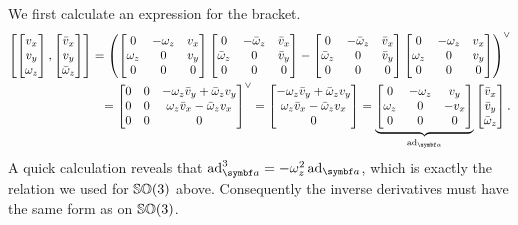 We first calculate an expression for the bracket.
\begin{equation}
  \begin{aligned}
    \left[ \begin{bmatrix} v_x \\ v_y \\ \omega_z \end{bmatrix}, \begin{bmatrix} \bar v_x \\ v_y \\ \bar \omega_z \end{bmatrix} \right] = \left( \begin{bmatrix}
      0 & -\omega_z & v_x \\ \omega_z & 0 & v_y \\ 0 & 0 & 0
    \end{bmatrix}\begin{bmatrix}
      0 & -\bar\omega_z & \bar v_x \\ \bar\omega_z & 0 & \bar v_y \\ 0 & 0 & 0
    \end{bmatrix} - \begin{bmatrix}
      0 & -\bar\omega_z & \bar v_x \\ \bar\omega_z & 0 & \bar v_y \\ 0 & 0 & 0
    \end{bmatrix}\begin{bmatrix}
      0 & -\omega_z & v_x \\ \omega_z & 0 & v_y \\ 0 & 0 & 0
    \end{bmatrix} \right)^{\vee} \\
    = \begin{bmatrix} 0 & 0 & -\omega_z \bar v_y + \bar \omega_z v_y \\
                0 & 0 & \omega_z \bar v_x - \bar \omega_z v_x  \\
                0 & 0 & 0
    \end{bmatrix}^\vee
    = \begin{bmatrix}  -\omega_z \bar v_y + \bar \omega_z v_y \\ \omega_z \bar v_x - \bar \omega_z v_x \\ 0 \end{bmatrix} = \underbrace{\begin{bmatrix}  0 & -\omega_z & v_y \\ \omega_z & 0 & -v_x \\ 0 & 0 & 0 \end{bmatrix}}_{\ad_\a} \begin{bmatrix} \bar v_x \\  \bar v_y  \\ \bar \omega_z \end{bmatrix}.
  \end{aligned}
\end{equation}
A quick calculation reveals that $\ad_\a^3 = -\omega_z^2 \ad_\a$, which is exactly the relation we used for ${\mathbb{SO}(3)}$ above. Consequently the inverse derivatives must have the same form as on ${\mathbb{SO}(3)}$.

